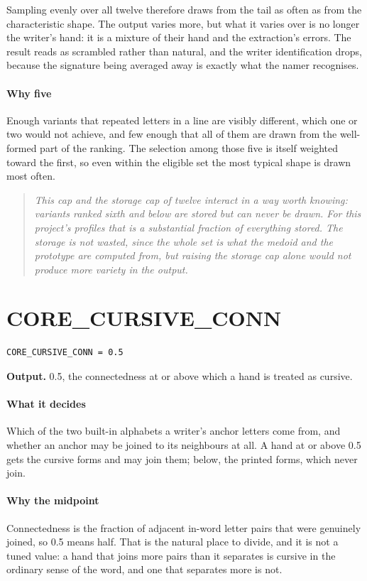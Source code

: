Sampling evenly over all twelve therefore draws from the tail as often as from the characteristic shape. The output varies more, but what it varies over is no longer the writer's hand: it is a mixture of their hand and the extraction's errors. The result reads as scrambled rather than natural, and the writer identification drops, because the signature being averaged away is exactly what the namer recognises.


\paragraph{Why five}
Enough variants that repeated letters in a line are visibly different, which one or two would not achieve, and few enough that all of them are drawn from the well-formed part of the ranking. The selection among those five is itself weighted toward the first, so even within the eligible set the most typical shape is drawn most often.


\begin{quote}\small\itshape This cap and the storage cap of twelve interact in a way worth knowing: variants ranked sixth and below are stored but can never be drawn. For this project's profiles that is a substantial fraction of everything stored. The storage is not wasted, since the whole set is what the medoid and the prototype are computed from, but raising the storage cap alone would not produce more variety in the output.\end{quote}

\section{CORE\_CURSIVE\_CONN}
\begin{lstlisting}[style=sig]
CORE_CURSIVE_CONN = 0.5
\end{lstlisting}

\noindent\textbf{Output.} 0.5, the connectedness at or above which a hand is treated as cursive.


\paragraph{What it decides}
Which of the two built-in alphabets a writer's anchor letters come from, and whether an anchor may be joined to its neighbours at all. A hand at or above 0.5 gets the cursive forms and may join them; below, the printed forms, which never join.


\paragraph{Why the midpoint}
Connectedness is the fraction of adjacent in-word letter pairs that were genuinely joined, so 0.5 means half. That is the natural place to divide, and it is not a tuned value: a hand that joins more pairs than it separates is cursive in the ordinary sense of the word, and one that separates more is not.


